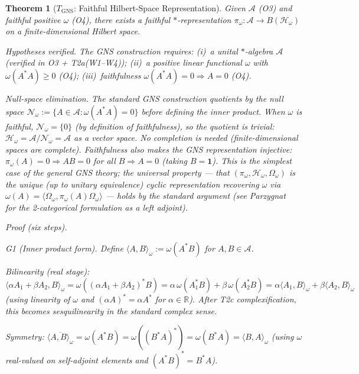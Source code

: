 \documentclass[11pt,a4paper]{article}
\newtheorem{theorem}{Theorem}[section]
\theoremstyle{definition}
\begin{document}
\begin{theorem}[$T_{\mathrm{GNS}}$: Faithful Hilbert-Space Representation]\label{thm:GNS}
Given $\mathcal{A}$ (O3) and faithful positive $\omega$ (O4), there exists a faithful $*$-representation $\pi_\omega: \mathcal{A} \to B(\mathcal{H}_\omega)$ on a finite-dimensional Hilbert space.

\smallskip\noindent\textit{Hypotheses verified.}  The GNS construction requires: (i)~a unital $*$-algebra $\mathcal{A}$ (verified in O3 + T2a(W1--W4)); (ii)~a positive linear functional $\omega$ with $\omega(A^*A) \ge 0$ (O4); (iii)~faithfulness $\omega(A^*A) = 0 \Rightarrow A = 0$ (O4).

\smallskip\noindent\textit{Null-space elimination.}  The standard GNS construction quotients by the null space $\mathcal{N}_\omega := \{A \in \mathcal{A} : \omega(A^*A) = 0\}$ before defining the inner product.  When $\omega$ is faithful, $\mathcal{N}_\omega = \{0\}$ (by definition of faithfulness), so the quotient is trivial: $\mathcal{H}_\omega = \mathcal{A}/\mathcal{N}_\omega = \mathcal{A}$ as a vector space.  No completion is needed (finite-dimensional spaces are complete).  Faithfulness also makes the GNS representation injective: $\pi_\omega(A) = 0 \Rightarrow AB = 0$ for all $B \Rightarrow A = 0$ (taking $B = \mathbf{1}$).  This is the simplest case of the general GNS theory; the universal property --- that $(\pi_\omega, \mathcal{H}_\omega, \Omega_\omega)$ is the unique (up to unitary equivalence) cyclic representation recovering $\omega$ via $\omega(A) = \langle \Omega_\omega, \pi_\omega(A)\Omega_\omega\rangle$ --- holds by the standard argument (see Parzygnat~\cite{Parzygnat2018} for the 2-categorical formulation as a left adjoint).

\noindent\textit{Proof} (six steps).

\textit{G1 (Inner product form).}  Define $\langle A, B\rangle_\omega := \omega(A^*B)$ for $A, B \in \mathcal{A}$.

\textit{Bilinearity (real stage):} $\langle \alpha A_1 + \beta A_2, B\rangle_\omega = \omega((\alpha A_1 + \beta A_2)^* B) = \alpha\,\omega(A_1^*B) + \beta\,\omega(A_2^*B) = \alpha\langle A_1,B\rangle_\omega + \beta\langle A_2,B\rangle_\omega$ (using linearity of $\omega$ and $(\alpha A)^* = \alpha A^*$ for $\alpha \in \mathbb{R}$).  After T2c complexification, this becomes sesquilinearity in the standard complex sense.

\textit{Symmetry:} $\overline{\langle A,B\rangle_\omega} = \omega(A^*B) = \omega((B^*A)^*) = \omega(B^*A) = \langle B,A\rangle_\omega$ (using $\omega$ real-valued on self-adjoint elements and $(A^*B)^* = B^*A$).


\end{theorem}
\end{document}
